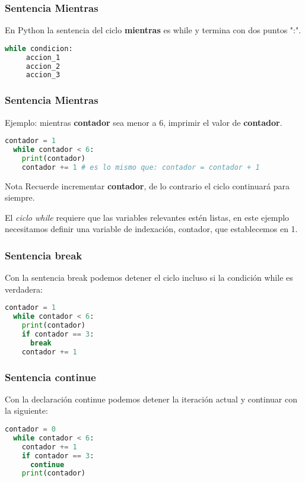 \begin{frame}[fragile]
  \frametitle{Sentencia Mientras}

  En Python la sentencia del ciclo \textbf{mientras} es
  \textcolor{codeKeyword}{while} y termina con dos puntos ":".

  \vspace{\baselineskip}
  \begin{lstlisting}[language=Python]
  while condicion:
     accion_1
     accion_2
     accion_3
  \end{lstlisting}
\end{frame}

\begin{frame}[fragile]
  \frametitle{Sentencia Mientras}

  Ejemplo: mientras \textbf{contador} sea menor a 6, imprimir el valor
  de \textbf{contador}.

  \vspace{\baselineskip}
  \begin{lstlisting}[language=Python]
  contador = 1
  while contador < 6:
    print(contador)
    contador += 1 # es lo mismo que: contador = contador + 1
  \end{lstlisting}

  \pausa
  \begin{alertblock}{Nota}
    Recuerde incrementar \textbf{contador}, de lo contrario el ciclo continuará
    para siempre.
  \end{alertblock}

  El \emph{ciclo while} requiere que las variables relevantes estén listas,
  en este ejemplo necesitamos definir una variable de indexación, contador,
  que establecemos en 1.
\end{frame}

\begin{frame}[fragile]
  \frametitle{Sentencia \textbf{break}}

  Con la sentencia \textcolor{codeKeyword}{break} podemos detener el ciclo incluso si la
  condición while es verdadera:

  \vspace{\baselineskip}
  \begin{lstlisting}[language=Python]
  contador = 1
  while contador < 6:
    print(contador)
    if contador == 3:
      break
    contador += 1
  \end{lstlisting}
\end{frame}

\begin{frame}[fragile]
  \frametitle{Sentencia \textbf{continue}}

  Con la declaración \textcolor{codeKeyword}{continue} podemos detener la iteración actual
  y continuar con la siguiente:

  \vspace{\baselineskip}
  \begin{lstlisting}[language=Python]
  contador = 0
  while contador < 6:
    contador += 1
    if contador == 3:
      continue
    print(contador)
  \end{lstlisting}
\end{frame}

